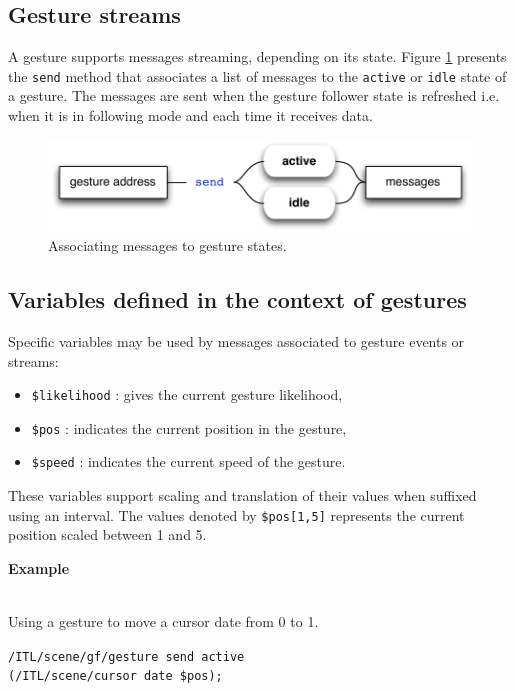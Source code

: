 \documentclass{article}
\newcommand{\code}[1]		{\texttt{\small #1}}
\newcounter{excount}
\newcommand{\exemple}			{\vspace{1mm} \hspace*{-4.5mm}\textbf{Example \arabic{excount}} \addtocounter{excount}{1}}
\newcommand{\sample}	[1]		{\begin{center}\colorbox{mygrey}{
								\begin{minipage}[t]{0.95\columnwidth} 
								{\small \texttt{#1}}
								\end{minipage}}\end{center}}
\begin{document}
\subsection{Gesture streams}\label{sec:gestream}

A gesture supports messages streaming, depending on its state. Figure \ref{fig:gestream} presents the \code{send} method that associates a list of messages to the \code{active} or \code{idle} state of a gesture. The messages are sent when the gesture follower state is refreshed i.e. when it is in following mode and each time it receives data.

\begin{figure}[htbp]
\centerline{
	\includegraphics[width=0.9\columnwidth]{imgs/gestream}}
\caption{Associating messages to gesture states.}
\label{fig:gestream}
\end{figure}

\subsection{Variables defined in the context of gestures}\label{sec:gesvar}

Specific variables may be used by messages associated to gesture events or streams:
\begin{itemize}
\item \code{\$likelihood} : gives the current gesture likelihood,
\item \code{\$pos} : indicates the current position in the gesture,
\item \code{\$speed} : indicates the current speed of the gesture.
\end{itemize}
These variables support scaling and translation of their values when suffixed using an interval. The values denoted by \code{\$pos[1,5]} represents the current position scaled between 1 and 5.

\exemple \\
Using a gesture to move a cursor date from 0 to 1.
\sample{/ITL/scene/gf/gesture send active \\
\hspace*{1.5cm}(/ITL/scene/cursor date \$pos);
}
\end{document}
